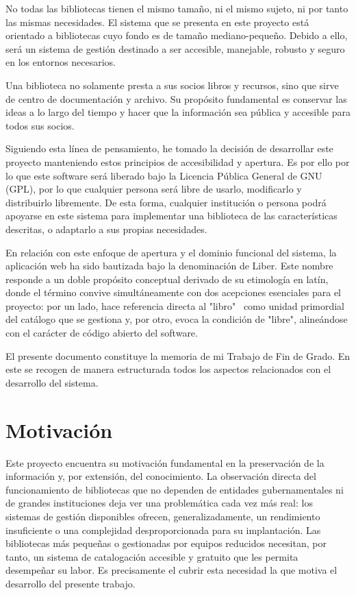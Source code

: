 No todas las bibliotecas tienen el mismo tamaño, ni el mismo sujeto, ni por tanto las mismas necesidades. El sistema que se presenta en este proyecto está orientado a bibliotecas cuyo fondo es de tamaño mediano-pequeño. Debido a ello, será un sistema de gestión destinado a ser accesible, manejable, robusto y seguro en los entornos necesarios.

Una biblioteca no solamente presta a sus socios libros y recursos, sino que sirve de centro de documentación y archivo. Su propósito fundamental es conservar las ideas a lo largo del tiempo y hacer que la información sea pública y accesible para todos sus socios. 

Siguiendo esta línea de pensamiento, he tomado la decisión de desarrollar este proyecto manteniendo estos principios de accesibilidad y apertura. Es por ello por lo que este software será liberado bajo la Licencia Pública General de GNU (GPL), por lo que cualquier persona será libre de usarlo, modificarlo y distribuirlo libremente. De esta forma, cualquier institución o persona podrá apoyarse en este sistema para implementar una biblioteca de las características descritas, o adaptarlo a sus propias necesidades.

En relación con este enfoque de apertura y el dominio funcional del sistema, la aplicación web ha sido bautizada bajo la denominación de Liber. Este nombre responde a un doble propósito conceptual derivado de su etimología en latín, donde el término convive simultáneamente con dos acepciones esenciales para el proyecto: por un lado, hace referencia directa al "libro" \ como unidad primordial del catálogo que se gestiona y, por otro, evoca la condición de "libre", alineándose con el carácter de código abierto del software.

El presente documento constituye la memoria de mi Trabajo de Fin de Grado. En este se recogen de manera estructurada todos los aspectos relacionados con el desarrollo del sistema.

\section{Motivación}

Este proyecto encuentra su motivación fundamental en la preservación de la información y, por extensión, del conocimiento. La observación directa del funcionamiento de bibliotecas que no dependen de entidades gubernamentales ni de grandes instituciones deja ver una problemática cada vez más real: los sistemas de gestión disponibles ofrecen, generalizadamente, un rendimiento insuficiente o una complejidad desproporcionada para su implantación. Las bibliotecas más pequeñas o gestionadas por equipos reducidos necesitan, por tanto, un sistema de catalogación accesible y gratuito que les permita desempeñar su labor. Es precisamente el cubrir esta necesidad la que motiva el desarrollo del presente trabajo. 

